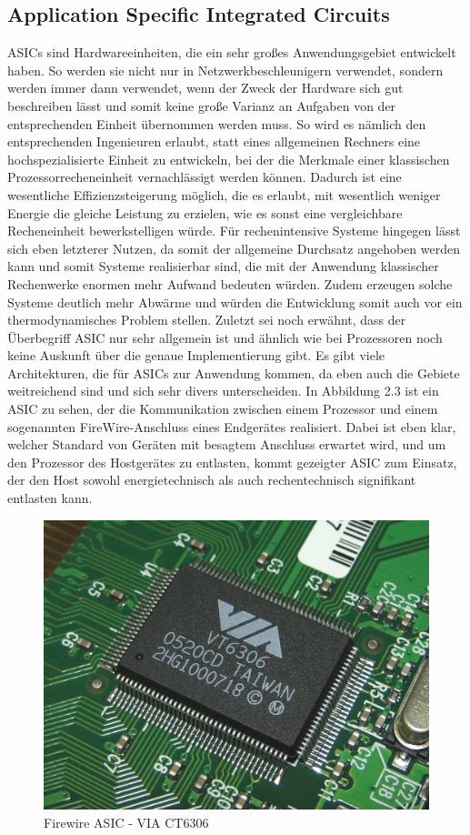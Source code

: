 \subsection{Application Specific Integrated Circuits}
ASICs sind Hardwareeinheiten, die ein sehr großes Anwendungsgebiet entwickelt haben. So werden sie nicht nur in Netzwerkbeschleunigern verwendet, sondern werden immer dann verwendet, wenn der Zweck der Hardware sich gut beschreiben lässt und somit keine große Varianz an Aufgaben von der entsprechenden Einheit übernommen werden muss. So wird es nämlich den entsprechenden Ingenieuren erlaubt, statt eines allgemeinen Rechners eine hochspezialisierte Einheit zu entwickeln, bei der die Merkmale einer klassischen Prozessorrecheneinheit vernachlässigt werden können. Dadurch ist eine wesentliche Effizienzsteigerung möglich, die es erlaubt, mit wesentlich weniger Energie die gleiche Leistung zu erzielen, wie es sonst eine vergleichbare Recheneinheit bewerkstelligen würde. Für rechenintensive Systeme hingegen lässt sich eben letzterer Nutzen, da somit der allgemeine Durchsatz angehoben werden kann und somit Systeme realisierbar sind, die mit der Anwendung klassischer Rechenwerke enormen mehr Aufwand bedeuten würden. Zudem erzeugen solche Systeme deutlich mehr Abwärme und würden die Entwicklung somit auch vor ein thermodynamisches Problem stellen. Zuletzt sei noch erwähnt, dass der Überbegriff ASIC nur sehr allgemein ist und ähnlich wie bei Prozessoren noch keine Auskunft über die genaue Implementierung gibt. Es gibt viele Architekturen, die für ASICs zur Anwendung kommen, da eben auch die Gebiete weitreichend sind und sich sehr divers unterscheiden. In Abbildung 2.3 ist ein ASIC zu sehen, der die Kommunikation zwischen einem Prozessor und einem sogenannten FireWire-Anschluss eines Endgerätes realisiert. Dabei ist eben klar, welcher Standard von Geräten mit besagtem Anschluss erwartet wird, und um den Prozessor des Hostgerätes zu entlasten, kommt gezeigter ASIC zum Einsatz, der den Host sowohl energietechnisch als auch rechentechnisch signifikant entlasten kann.
\begin{figure}
    \centering
    \includegraphics[width=0.5\linewidth]{images/Buffalo_IFC-ILP4_VIA_VT6306.jpg}
    \caption{Firewire ASIC - VIA CT6306}
    \label{fig:enter-label}
\end{figure}

